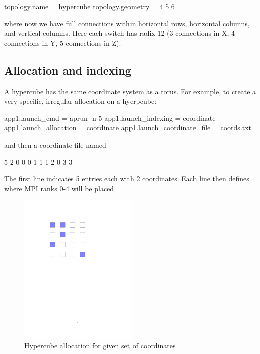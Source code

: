 \begin{ViFile}
topology.name = hypercube
topology.geometry = 4 5 6
\end{ViFile}

where now we have full connections within horizontal rows, horizontal columns, and vertical columns.
Here each switch has radix 12 (3 connections in X, 4 connections in Y, 5 connections in Z). 

\subsection{Allocation and indexing}
A hypercube has the same coordinate system as a torus. For example, to create a very specific, irregular allocation on a hyerpcube:

\begin{ViFile}
app1.launch_cmd = aprun -n 5
app1.launch_indexing = coordinate
app1.launch_allocation = coordinate
app1.launch_coordinate_file = coords.txt
\end{ViFile}

and then a coordinate file named 
\begin{ViFile}
5 2
0 0
0 1
1 1
2 0
3 3
\end{ViFile}
The first line indicates 5 entries each with 2 coordinates.
Each line then defines where MPI ranks 0-4 will be placed

\begin{figure}[h!]
\centering
\includegraphics[width=0.5\textwidth]{figures/tikz/hypercube/hypercube_allocation.pdf}
\caption{Hypercube allocation for given set of coordinates}
\label{fig:topologies:hypercubeAllocation}
\end{figure}

